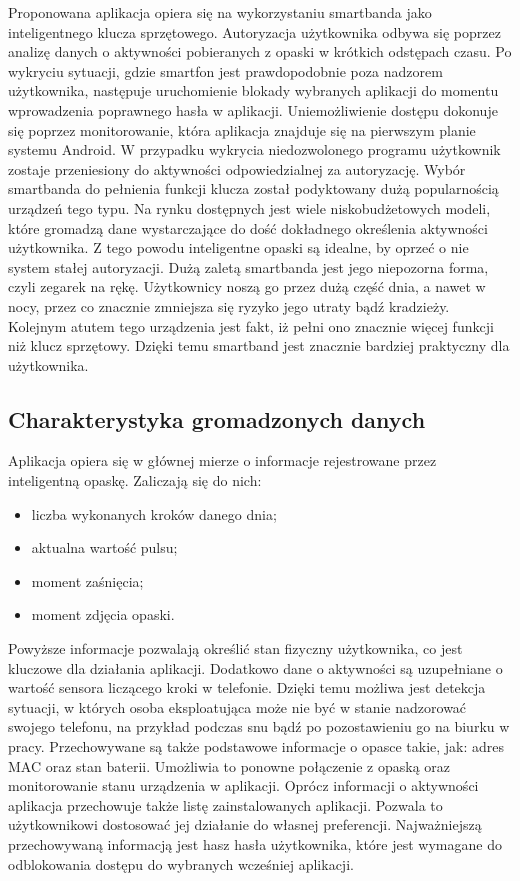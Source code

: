 \indent Proponowana aplikacja opiera się na wykorzystaniu smartbanda jako inteligentnego klucza sprzętowego. Autoryzacja użytkownika odbywa się poprzez analizę danych o aktywności pobieranych z opaski w krótkich odstępach czasu. Po wykryciu sytuacji, gdzie smartfon jest prawdopodobnie poza nadzorem użytkownika,
następuje uruchomienie blokady wybranych aplikacji do momentu wprowadzenia poprawnego hasła w aplikacji. Uniemożliwienie dostępu dokonuje się poprzez
monitorowanie, która aplikacja znajduje się na pierwszym planie systemu Android. W przypadku wykrycia niedozwolonego programu użytkownik zostaje
przeniesiony do aktywności odpowiedzialnej za autoryzację.
\newline\newline
\indent Wybór smartbanda do pełnienia funkcji klucza został podyktowany dużą popularnością urządzeń tego typu. Na rynku dostępnych jest wiele niskobudżetowych
modeli, które gromadzą dane wystarczające do dość dokładnego określenia aktywności użytkownika. Z tego powodu inteligentne opaski są idealne, by oprzeć
o nie system stałej autoryzacji. Dużą zaletą smartbanda jest jego niepozorna forma, czyli zegarek na rękę. Użytkownicy noszą go przez dużą
część dnia, a nawet w nocy, przez co znacznie zmniejsza się ryzyko jego utraty bądź kradzieży. Kolejnym atutem tego urządzenia jest fakt, iż pełni ono znacznie więcej funkcji niż klucz sprzętowy. Dzięki temu smartband jest znacznie bardziej praktyczny dla użytkownika.

\subsection{Charakterystyka gromadzonych danych}
Aplikacja opiera się w głównej mierze o informacje rejestrowane przez inteligentną opaskę. Zaliczają się do nich:
\begin{itemize}
    \item liczba wykonanych kroków danego dnia;
    \item aktualna wartość pulsu;
    \item moment zaśnięcia;
    \item moment zdjęcia opaski.
\end{itemize}

\indent Powyższe informacje pozwalają określić stan fizyczny użytkownika, co jest kluczowe dla działania aplikacji. Dodatkowo dane o aktywności są uzupełniane
o wartość sensora liczącego kroki w telefonie. Dzięki temu możliwa jest detekcja sytuacji, w których osoba eksploatująca może nie być w stanie
nadzorować swojego telefonu, na przykład podczas snu bądź po pozostawieniu go na biurku w pracy. Przechowywane są także podstawowe informacje o opasce takie, jak: adres MAC oraz stan baterii. Umożliwia to ponowne połączenie z opaską oraz monitorowanie stanu urządzenia w aplikacji.
\newline\newline
\indent Oprócz informacji o aktywności aplikacja przechowuje także listę zainstalowanych aplikacji. Pozwala to użytkownikowi dostosować jej działanie do własnej preferencji. Najważniejszą przechowywaną informacją jest hasz hasła użytkownika, które jest wymagane do odblokowania dostępu do wybranych wcześniej aplikacji.

